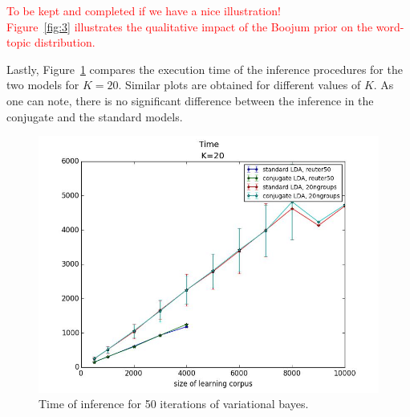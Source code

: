 \textcolor{red}{To be kept and completed if we have a nice illustration!\\ Figure~\ref{fig:3} illustrates the qualitative impact of the Boojum prior on the word-topic distribution.}

Lastly, Figure~\ref{fig:time} compares the execution time of the inference procedures for the two models for $K=20$. Similar plots are obtained for different values of $K$. As one can note, there is no significant difference between the inference in the conjugate and the standard models.

\begin{figure}[h]
\label{fig:time}
\includegraphics[scale=0.4]{results/time}
\caption{Time of inference for 50 iterations of variational bayes.}
\end{figure}
